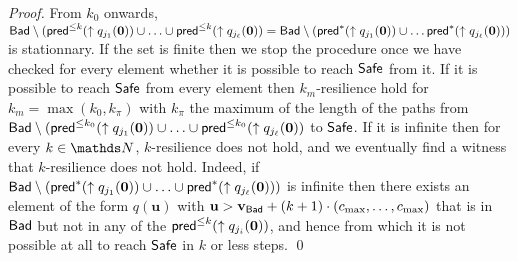 \begin{proof}
From $k_0$ onwards,
$\textsf{Bad} \setminus (\textsf{pred}^{\leq k}(\uparrow q_{j_1}(\textbf{0}))\cup \ldots \cup \textsf{pred}^{\leq k}(\uparrow q_{j_\ell}(\textbf{0}))= 
\textsf{Bad} \setminus (\textsf{pred}^{*}(\uparrow q_{j_1}(\textbf{0})) \cup \ldots \textsf{pred}^{*}(\uparrow q_{j_\ell}(\textbf{0})) )$
is stationnary. 
If the set is finite then we stop the procedure once we have checked for every element
whether it is possible to reach $\textsf{Safe}$ from it.
If it is possible to reach $\textsf{Safe}$ from every element then {\sc $k_m$-resilience}
hold
for $k_m = \max(k_0, k_{\pi})$ with 
$k_{\pi}$ the maximum of the length of the paths from 
$\textsf{Bad} \setminus (\textsf{pred}^{\leq k_0}(\uparrow q_{j_1}(\textbf{0}))\cup \ldots \cup \textsf{pred}^{\leq k_0}(\uparrow q_{j_\ell}(\textbf{0}))$ to $\textsf{Safe}$.
If it is infinite then
for every $k \in \N$,
$k$-resilience does not hold, 
and we eventually find a witness that $k$-resilience does not hold.
Indeed, 
if
$\textsf{Bad} \setminus (\textsf{pred}^{*}(\uparrow q_{j_1}(\textbf{0})) \cup \ldots \cup \textsf{pred}^{*}(\uparrow q_{j_\ell}(\textbf{0})) )$
is
infinite
then
there exists an element of the form $q(\textbf{u} )$
with $\textbf{u} > \textbf{v}_{\textsf{Bad}} + (k+1) \cdot (c_{\max}, \ldots, c_{\max})$ 
that is in $\textsf{Bad}$ but not in any of the $\textsf{pred}^{\leq k}(\uparrow q_{j_i}(\textbf{0}))$,
and hence from which it is not possible at all to reach
$\textsf{Safe}$ in $k$ or less steps.
\qed
\end{proof}












